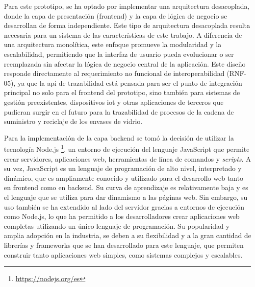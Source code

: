 Para este prototipo, se ha optado por implementar una arquitectura desacoplada, donde la capa de presentación (frontend) y la capa de lógica de negocio se desarrollan de forma independiente. Este tipo de arquitectura desacoplada resulta necesaria para un sistema de las características de este trabajo. A diferencia de una arquitectura monolítica, este enfoque promueve la modularidad y la escalabilidad, permitiendo que la interfaz de usuario pueda evolucionar o ser reemplazada sin afectar la lógica de negocio central de la aplicación. Este diseño responde directamente al requerimiento no funcional de interoperabilidad (RNF-05), ya que la \acrshort{api} de trazabilidad está pensada para ser el punto de integración principal no solo para el frontend del prototipo, sino también para sistemas de gestión preexistentes, dispositivos \acrshort{iot} y otras aplicaciones de terceros que pudieran surgir en el futuro para la trazabilidad de procesos de la cadena de suministro y reciclaje de los envases de vidrio.

Para la implementación de la capa backend se tomó la decisión de utilizar la tecnología Node.js \footnote{\url{https://nodejs.org/es}}, un entorno de ejecución del lenguaje JavaScript que permite crear servidores, aplicaciones web, herramientas de línea de comandos y \textit{scripts}. A su vez, JavaScript es un lenguaje de programación de alto nivel, interpretado y dinámico, que es ampliamente conocido y utilizado para el desarrollo web tanto en frontend como en backend. Su curva de aprendizaje es relativamente baja y es el lenguaje que se utiliza para dar dinamismo a las páginas web. Sin embargo, su uso también se ha extendido al lado del servidor gracias a entornos de ejecución como Node.js, lo que ha permitido a los desarrolladores crear aplicaciones web completas utilizando un único lenguaje de programación. Su popularidad y amplia adopción en la industria, se deben a su flexibilidad y a la gran cantidad de librerías y frameworks que se han desarrollado para este lenguaje, que permiten construir tanto aplicaciones web simples, como sistemas complejos y escalables.


